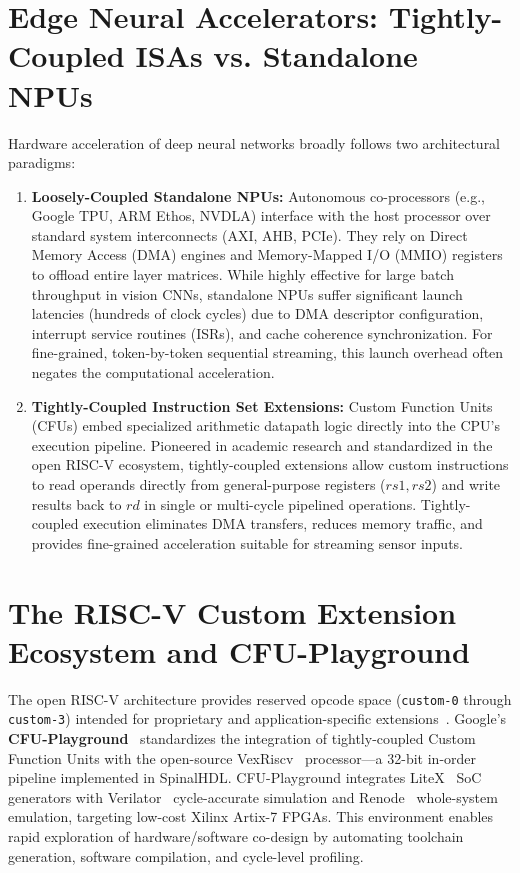 \documentclass[11pt,a4paper,oneside]{report}
\begin{document}
\section{Edge Neural Accelerators: Tightly-Coupled ISAs vs. Standalone NPUs}
Hardware acceleration of deep neural networks broadly follows two architectural paradigms:
\begin{enumerate}
    \item \textbf{Loosely-Coupled Standalone NPUs:} Autonomous co-processors (e.g., Google TPU, ARM Ethos, NVDLA) interface with the host processor over standard system interconnects (AXI, AHB, PCIe). They rely on Direct Memory Access (DMA) engines and Memory-Mapped I/O (MMIO) registers to offload entire layer matrices. While highly effective for large batch throughput in vision CNNs, standalone NPUs suffer significant launch latencies (hundreds of clock cycles) due to DMA descriptor configuration, interrupt service routines (ISRs), and cache coherence synchronization. For fine-grained, token-by-token sequential streaming, this launch overhead often negates the computational acceleration.
    \item \textbf{Tightly-Coupled Instruction Set Extensions:} Custom Function Units (CFUs) embed specialized arithmetic datapath logic directly into the CPU's execution pipeline. Pioneered in academic research and standardized in the open RISC-V ecosystem, tightly-coupled extensions allow custom instructions to read operands directly from general-purpose registers ($rs1, rs2$) and write results back to $rd$ in single or multi-cycle pipelined operations. Tightly-coupled execution eliminates DMA transfers, reduces memory traffic, and provides fine-grained acceleration suitable for streaming sensor inputs.
\end{enumerate}

\section{The RISC-V Custom Extension Ecosystem and CFU-Playground}
The open RISC-V architecture provides reserved opcode space (\texttt{custom-0} through \texttt{custom-3}) intended for proprietary and application-specific extensions~\cite{waterman2014risc}. Google's \textbf{CFU-Playground}~\cite{cfu_playground} standardizes the integration of tightly-coupled Custom Function Units with the open-source VexRiscv~\cite{vexriscv} processor---a 32-bit in-order pipeline implemented in SpinalHDL. CFU-Playground integrates LiteX~\cite{litex} SoC generators with Verilator~\cite{verilator} cycle-accurate simulation and Renode~\cite{renode} whole-system emulation, targeting low-cost Xilinx Artix-7 FPGAs. This environment enables rapid exploration of hardware/software co-design by automating toolchain generation, software compilation, and cycle-level profiling.
\end{document}
